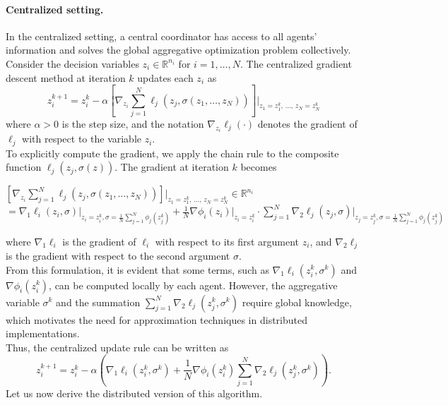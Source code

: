 \paragraph{Centralized setting.}
In the centralized setting, a central coordinator has access to all agents' information and solves the global aggregative optimization problem collectively. \\  
Consider the decision variables \( z_i \in \mathbb{R}^{n_i} \) for \( i = 1, \ldots, N \). The centralized gradient descent method at iteration \( k \) updates each \( z_i \) as
\[
z_i^{k+1} = z_i^k - \alpha \left[ \nabla_{z_i} \sum_{j=1}^N \ell_j(z_j, \sigma(z_1, \ldots, z_N)) \right] \Bigg|_{z_1 = z_1^k,\, \dots,\, z_N = z_N^k}
\]
where \(\alpha > 0\) is the step size, and the notation \(\nabla_{z_i} \ell_j(\cdot)\) denotes the gradient of \(\ell_j\) with respect to the variable \(z_i\). \\
To explicitly compute the gradient, we apply the chain rule to the composite function \(\ell_j(z_j, \sigma(z))\).
The gradient at iteration \(k\) becomes
\begin{center}
    $[\nabla_{z_i} \sum_{j=1}^{N} \ell_j(z_j, \sigma(z_1, \dots, z_N))] \Bigg|_{z_1 = z_1^k,\, \dots,\, z_N = z_N^k} \in \mathbb{R}^{n_i}$ \\
    $= \nabla_1 \ell_i(z_i, \sigma) \Bigg|_{z_i = z_i^k, \sigma = \frac{1}{N}\sum_{j=1}^N \phi_j(z_j^k)} + \frac{1}{N}\nabla \phi_i(z_i) \Bigg|_{z_i = z_i^k} \cdot \sum_{j=1}^N \nabla_2 \ell_j(z_j, \sigma) \Bigg|_{z_j = z_j^k, \sigma = \frac{1}{N}\sum_{j=1}^N \phi_j(z_j^k)}$
\end{center}
where \(\nabla_1 \ell_i\) is the gradient of \(\ell_i\) with respect to its first argument \(z_i\), and \(\nabla_2 \ell_j\) is the gradient with respect to the second argument \(\sigma\). \\
From this formulation, it is evident that some terms, such as \(\nabla_1 \ell_i(z_i^k, \sigma^k)\) and \(\nabla \phi_i(z_i^k)\), can be computed locally by each agent. However, the aggregative variable \(\sigma^k\) and the summation \(\sum_{j=1}^N \nabla_2 \ell_j(z_j^k, \sigma^k)\) require global knowledge, which motivates the need for approximation techniques in distributed implementations. \\
Thus, the centralized update rule can be written as
\[
z_i^{k+1} = z_i^k - \alpha \left( \nabla_1 \ell_i(z_i^k, \sigma^k) + \frac{1}{N} \nabla \phi_i(z_i^k) \sum_{j=1}^N \nabla_2 \ell_j(z_j^k, \sigma^k) \right).
\]
Let us now derive the distributed version of this algorithm. \\

